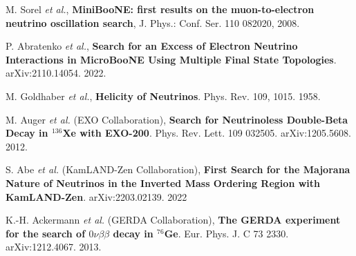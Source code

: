  M. Sorel \textit{et al.}, \textbf{MiniBooNE: first results on the muon-to-electron neutrino oscillation search}, J. Phys.: Conf. Ser. 110 082020, 2008.

 P. Abratenko \textit{et al.}, \textbf{Search for an Excess of Electron Neutrino Interactions in MicroBooNE Using Multiple Final State Topologies}. arXiv:2110.14054. 2022.

 M. Goldhaber \textit{et al.}, \textbf{Helicity of Neutrinos}. Phys. Rev. 109, 1015. 1958. 

 M. Auger \textit{et al.} (EXO Collaboration), \textbf{Search for Neutrinoless Double-Beta Decay in $^{136}$Xe with EXO-200}. Phys. Rev. Lett. 109 032505. arXiv:1205.5608. 2012.

 S. Abe \textit{et al.} (KamLAND-Zen Collaboration), \textbf{First Search for the Majorana Nature of Neutrinos in the Inverted Mass Ordering Region with KamLAND-Zen}. arXiv:2203.02139. 2022

 K.-H. Ackermann \textit{et al.} (GERDA Collaboration), \textbf{The GERDA experiment for the search of $0 \nu \beta \beta$ decay in $^{76}$Ge}. Eur. Phys. J. C 73 2330. arXiv:1212.4067. 2013.